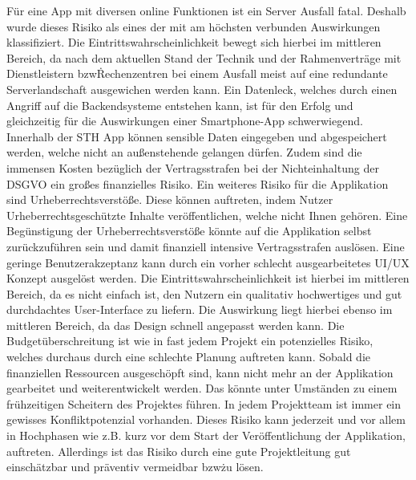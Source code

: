 Für eine App mit diversen online Funktionen ist ein Server Ausfall fatal.
Deshalb wurde dieses Risiko als eines der mit am höchsten verbunden Auswirkungen klassifiziert.
Die Eintrittswahrscheinlichkeit bewegt sich hierbei im mittleren Bereich, da nach dem aktuellen Stand der Technik und der Rahmenverträge mit Dienstleistern bzw\. Rechenzentren bei einem Ausfall meist auf eine redundante Serverlandschaft ausgewichen werden kann.\newline
Ein Datenleck, welches durch einen Angriff auf die Backendsysteme entstehen kann, ist für den Erfolg und gleichzeitig für die Auswirkungen einer Smartphone-App schwerwiegend.
Innerhalb der STH App können sensible Daten eingegeben und abgespeichert werden, welche nicht an außenstehende gelangen dürfen.
Zudem sind die immensen Kosten bezüglich der Vertragsstrafen bei der Nichteinhaltung der DSGVO ein großes finanzielles Risiko.\newline
Ein weiteres Risiko für die Applikation sind Urheberrechtsverstöße.
Diese können auftreten, indem Nutzer Urheberrechtsgeschützte Inhalte veröffentlichen, welche nicht Ihnen gehören.
Eine Begünstigung der Urheberrechtsverstöße könnte auf die Applikation selbst zurückzuführen sein und damit finanziell intensive Vertragsstrafen auslösen.\newline
Eine geringe Benutzerakzeptanz kann durch ein vorher schlecht ausgearbeitetes UI/UX Konzept ausgelöst werden.
Die Eintrittswahrscheinlichkeit ist hierbei im mittleren Bereich, da es nicht einfach ist, den Nutzern ein qualitativ hochwertiges und gut durchdachtes User-Interface zu liefern.
Die Auswirkung liegt hierbei ebenso im mittleren Bereich, da das Design schnell angepasst werden kann.\newline
Die Budgetüberschreitung ist wie in fast jedem Projekt ein potenzielles Risiko, welches durchaus durch eine schlechte Planung auftreten kann.
Sobald die finanziellen Ressourcen ausgeschöpft sind, kann nicht mehr an der Applikation gearbeitet und weiterentwickelt werden.
Das könnte unter Umständen zu einem frühzeitigen Scheitern des Projektes führen.\newline
In jedem Projektteam ist immer ein gewisses Konfliktpotenzial vorhanden.
Dieses Risiko kann jederzeit und vor allem in Hochphasen wie z.B. kurz vor dem Start der Veröffentlichung der Applikation, auftreten.
Allerdings ist das Risiko durch eine gute Projektleitung gut einschätzbar und präventiv vermeidbar bzw\. zu lösen.